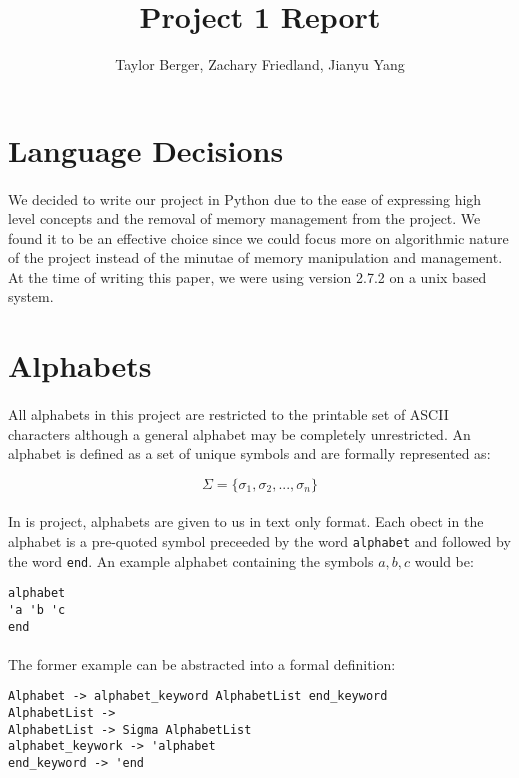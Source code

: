 \documentclass{article}
\begin{document}
\title{Project 1 Report}
\author{Taylor Berger, Zachary Friedland, Jianyu Yang}
\maketitle

\section{Language Decisions}
\paragraph{} We decided to write our project in Python due to the ease of
expressing high level concepts and the removal of memory management
from the project. We found it to be an effective choice since we could
focus more on algorithmic nature of the project instead of the minutae
of memory manipulation and management. At the time of writing this
paper, we were using version 2.7.2 on a unix based system.

\section{Alphabets}
\label{sec:alphabet}
\paragraph{} All alphabets in this project are restricted to the printable set of
ASCII characters although a general alphabet may be completely
unrestricted. An alphabet is defined as a set of unique symbols and are formally represented as:

\[\Sigma = \{\sigma_1, \sigma_2, ... ,\sigma_n\}\]

\paragraph{} In is project, alphabets are given to us in text only format.
 Each obect in the alphabet is a pre-quoted symbol preceeded by the
 word \verb|alphabet| and followed by the word \verb|end|. An example
 alphabet containing the symbols $a,b,c$ would be:

\begin{verbatim}
alphabet
'a 'b 'c
end
\end{verbatim}

\paragraph{} The former example can be abstracted into a formal definition:
\begin{verbatim}
Alphabet -> alphabet_keyword AlphabetList end_keyword
AlphabetList -> 
AlphabetList -> Sigma AlphabetList
alphabet_keywork -> 'alphabet
end_keyword -> 'end
\end{verbatim}
\end{document}
